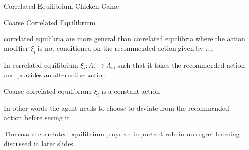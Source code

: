\begin{frame}[t]{Correlated Equilibrium Chicken Game}

\vspace{10pt}

\centering
\gamechicken 

\begin{flushleft}

    
\end{flushleft}

\end{frame}

\begin{frame}{Coarse Correlated Equilibrium}

 correlated equilibria are more general than correlated equilibria where the action modifier \(\xi_i\) is not conditioned on the recommended action given by \(\pi_c\).

\blist
    \item In correlated equilibrium \(\xi_i: A_i \to A_i\), such that it takes the recommended action and provides an alternative action
    \item Coarse correlated equilibrium \(\xi_i\) is a constant action
    \item In other words the agent needs to choose to deviate from the recommended action before seeing it
    \item The coarse correlated equilibrium plays an important role in no-regret learning discussed in later slides
\elist
    
\end{frame}

